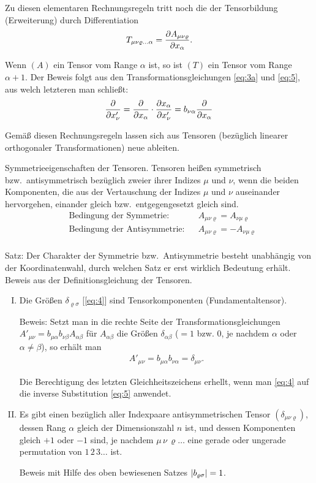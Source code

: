 Zu diesen elementaren Rechnungsregeln tritt noch die der Tensorbildung 
(Erweiterung) durch Differentiation
\begin{align}
T_{\mu\nu\varrho\ldots\alpha} = {\frac{\partial{A_{\mu\nu\varrho}}}{\partial{x_{\alpha}}}}.
\label{eq:12}
\end{align}

Wenn $(A)$ ein Tensor vom Range $\alpha$ ist, so ist $(T)$ ein Tensor vom Range 
$\alpha + 1$. Der Beweis folgt aus den Transformationsgleichungen \eqref{eq:3a} 
und \eqref{eq:5}, aus welch letzteren man schließt:
\begin{align}
{\frac{\partial{}}{\partial{x'_{\nu}}}} = 
{\frac{\partial{}}{\partial{x_{\alpha}}}} \cdot {\frac{\partial{x_{\alpha}}}{\partial{x'_{\nu}}}} = 
b_{\nu\alpha} {\frac{\partial{}}{\partial{x_{\alpha}}}}
\end{align}

Gemäß diesen Rechnungsregeln lassen sich aus Tensoren (bezüglich linearer 
orthogonaler Transformationen) neue ableiten.

Symmetrieeigenschaften der Tensoren. Tensoren heißen symmetrisch bzw.\ 
antisymmetrisch bezüglich zweier ihrer Indizes $\mu$ und $\nu$, wenn die beiden 
Komponenten, die aus der Vertauschung der Indizes $\mu$ und $\nu$ auseinander 
hervorgehen, einander gleich bzw.\ entgegengesetzt gleich sind.
\begin{align*}
&\text{Bedingung der Symmetrie:} && A_{\mu\nu\varrho} = A_{\nu\mu\varrho}
\\
&\text{Bedingung der Antisymmetrie:} && A_{\mu\nu\varrho} = -A_{\nu\mu\varrho}
\\
\end{align*}

Satz: Der Charakter der Symmetrie bzw.\ Antisymmetrie besteht unabhängig von 
der Koordinatenwahl, durch welchen Satz er erst wirklich Bedeutung erhält. 
Beweis aus der Definitionsgleichung der Tensoren.

\begin{enumerate}[I.]
\item
Die Größen $\delta_{\varrho\sigma}$ [\cref{eq:4}] sind Tensorkomponenten 
(Fundamentaltensor).

Beweis: Setzt man in die rechte Seite der Transformationsgleichungen 
$A'_{\mu\nu} = b_{\mu\alpha} b_{\nu\beta} A_{\alpha\beta}$ für 
$A_{\alpha\beta}$ die Größen $\delta_{\alpha\beta}$ ($=1$ bzw. $0$, je nachdem 
$\alpha$ oder $\alpha \neq \beta$), so erhält man
\begin{align*}
A'_{\mu\nu} = b_{\mu\alpha} b_{\nu\alpha} = \delta_{\mu\nu}.
\end{align*}

Die Berechtigung des letzten Gleichheitszeichens erhellt, wenn man \eqref{eq:4} 
auf die inverse Substitution \eqref{eq:5} anwendet.

\item
Es gibt einen bezüglich aller Indexpaare antisymmetrischen Tensor 
$(\delta_{\mu\nu\varrho})$, dessen Rang $\alpha$ gleich der Dimensionszahl $n$ 
ist, und dessen Komponenten gleich $+1$ oder $-1$ sind, je nachdem 
$\mu\,\nu\,\varrho\ldots$ eine gerade oder ungerade permutation von 
$1\,2\,3\ldots$ ist.

Beweis mit Hilfe des oben bewiesenen Satzes ${\left|b_{\varrho\sigma}\right|} = 1$.
\end{enumerate}

